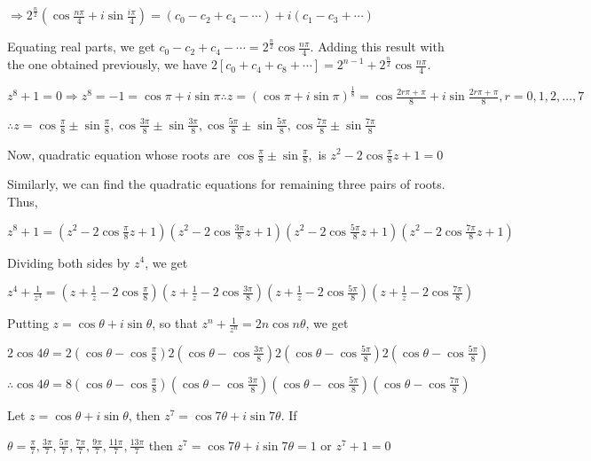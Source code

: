   $\Rightarrow 2^{\frac{n}{2}}\left(\cos\frac{n\pi}{4}+i\sin\frac{i\pi}{4}\right) = (c_0 -c_2 + c_4 - \cdots) + i(c_1 - c_3 + \cdots)$

  Equating real parts, we get $c_0 - c_2 + c_4 - \cdots = 2^{\frac{n}{2}}\cos\frac{n\pi}{4}$. Adding this
  result with the one obtained previously, we have $2[c_0 + c_4 + c_8 + \cdots] = 2^{n - 1} + 2^{\frac{n}{2}}\cos\frac{n\pi}{4}$.
\item $z^8 + 1 = 0 \Rightarrow z^8 = -1 = \cos\pi + i \sin\pi\therefore z = (\cos\pi + i \sin\pi)^{\frac{1}{8}} =
  \cos\frac{2r\pi + \pi}{8} + i \sin\frac{2r\pi + \pi}{8}, r = 0, 1, 2, \ldots, 7$

  $\therefore z = \cos\frac{\pi}{8} \pm \sin\frac{\pi}{8}, \cos\frac{3\pi}{8} \pm \sin\frac{3\pi}{8},
  \cos\frac{5\pi}{8} \pm \sin\frac{5\pi}{8}, \cos\frac{7\pi}{8} \pm \sin\frac{7\pi}{8}$

  Now, quadratic equation whose roots are $\cos\frac{\pi}{8} \pm \sin\frac{\pi}{8},$ is $z^2 -
  2\cos\frac{\pi}{8}z + 1 = 0$

  Similarly, we can find the quadratic equations for remaining three pairs of roots. Thus,

  $z^8 + 1 = \left(z^2 - 2\cos\frac{\pi}{8}z + 1\right)\left(z^2 - 2\cos\frac{3\pi}{8}z + 1\right)\left(z^2
  - 2\cos\frac{5\pi}{8}z + 1\right)\left(z^2 - 2\cos\frac{7\pi}{8}z + 1\right)$

  Dividing both sides by $z^4$, we get

  $z^4 + \frac{1}{z^4} = \left(z + \frac{1}{z} - 2\cos\frac{\pi}{8}\right)\left(z + \frac{1}{z} -
  2\cos\frac{3\pi}{8}\right)\left(z + \frac{1}{z} - 2\cos\frac{5\pi}{8}\right)\left(z + \frac{1}{z} -
  2\cos\frac{7\pi}{8}\right)$

  Putting $z = \cos\theta + i\sin\theta$, so that $z^n + \frac{1}{z^n} = 2n\cos n\theta$, we get

  $2\cos 4\theta = 2\left(\cos \theta - \cos\frac{\pi}{8}\right)2\left(\cos \theta -
  \cos\frac{3\pi}{8}\right)2\left(\cos \theta - \cos\frac{5\pi}{8}\right)2\left(\cos \theta -
  \cos\frac{5\pi}{8}\right)$

  $\therefore \cos 4\theta = 8\left(\cos \theta - \cos\frac{\pi}{8}\right)\left(\cos \theta -
  \cos\frac{3\pi}{8}\right)\left(\cos \theta - \cos\frac{5\pi}{8}\right)\left(\cos \theta -
  \cos\frac{7\pi}{8}\right)$
\item Let $z = \cos\theta + i \sin\theta$, then $z^7 = \cos 7\theta + i \sin 7\theta$. If

  $\theta = \frac{\pi}{7}, \frac{3\pi}{7}, \frac{5\pi}{7}, \frac{7\pi}{7}, \frac{9\pi}{7}, \frac{11\pi}{7},
  \frac{13\pi}{7}$ then $z^7 = \cos 7\theta + i \sin 7\theta = 1$ or $z^7 + 1 =0$

